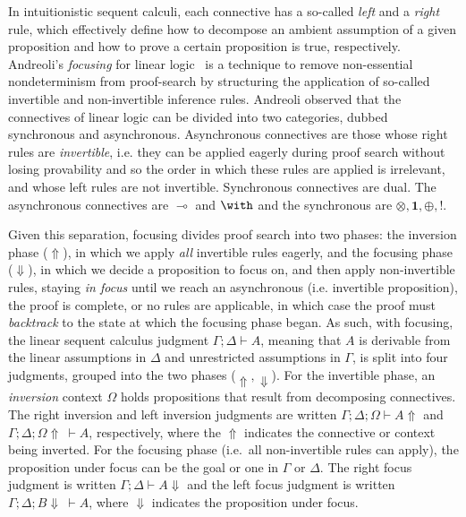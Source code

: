 \documentclass{llncs}
\newcommand{\lolli}{\multimap}
\newcommand{\tensor}{\otimes}
\newcommand{\bang}{{!}}
\begin{document}
In intuitionistic sequent calculi, each connective has a so-called \emph{left}
and a \emph{right} rule, which effectively define how to decompose an ambient
assumption of a given proposition and how to prove a certain proposition is
true, respectively.  Andreoli's \emph{focusing} for linear logic~\cite{10.1093/logcom/2.3.297} 
is a technique to remove non-essential nondeterminism from
proof-search by structuring the application of so-called invertible and
non-invertible inference rules. Andreoli observed that the connectives of linear
logic can be divided into two categories, dubbed synchronous and asynchronous.
Asynchronous connectives are those whose right rules are \emph{invertible}, i.e.
they can be applied eagerly during proof search without losing provability and
so the order in which these rules are applied is irrelevant, and whose left
rules are not invertible. Synchronous connectives are dual. The asynchronous
connectives are $\lolli$ and $\with$ and the synchronous are
$\tensor,\textbf{1},\oplus,\bang$.

Given this separation, focusing divides proof search into two
phases: %
the inversion phase ($\Uparrow$), in which we apply \emph{all}
invertible rules eagerly, and the focusing phase ($\Downarrow$), in
which we decide a proposition to focus on, and then apply
non-invertible rules, staying \emph{in focus} until we reach an
asynchronous (i.e. invertible proposition), the proof is complete, or
no rules are applicable, in which case the proof must \emph{backtrack}
to the state at which the focusing phase began.  As such, with
focusing, the linear sequent calculus judgment 
$\Gamma; \Delta \vdash A$, meaning that $A$ is derivable from the linear
assumptions in $\Delta$ and unrestricted assumptions in $\Gamma$,
is split into four judgments, grouped into the two phases ($\Uparrow,
\Downarrow$).
%
For the invertible phase, an \emph{inversion} 
context $\Omega$ holds propositions that result from
decomposing connectives.
The right inversion and left inversion judgments are written
$\Gamma; \Delta; \Omega \vdash A \Uparrow$ and $\Gamma; \Delta;
\Omega \Uparrow\ \vdash A$, respectively, where the $\Uparrow$
indicates the connective or context being inverted.
For the focusing phase (i.e.~all non-invertible rules can apply), 
the proposition under focus can be the goal or 
one in $\Gamma$ or $\Delta$. The right focus judgment is written 
$\Gamma;\Delta \vdash A \Downarrow$ and the left focus judgment is
written $\Gamma;\Delta; B\Downarrow\ \vdash A$, where $\Downarrow$
indicates the proposition under focus.
\end{document}
